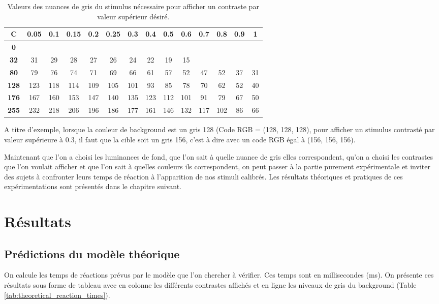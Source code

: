 	\begin{table}[h]	
		\centering
		\caption{Valeurs des nuances de gris du stimulus nécessaire pour afficher un contraste par valeur supérieur désiré.}
		\label{tab:contraste_inf}
		\begin{tabular}{c|ccccccccccccc}
			\textbf{C} & \textbf{0.05} & \textbf{0.1} & \textbf{0.15} & \textbf{0.2} & \textbf{0.25} & \textbf{0.3} & \textbf{0.4} & \textbf{0.5} & \textbf{0.6} & \textbf{0.7} & \textbf{0.8} & \textbf{0.9} & \textbf{1}\\
			\hline
			\textbf{0}\\
			\textbf{32} & 31 & 29 & 28 & 27 & 26 & 24 & 22 & 19 & 15\\
			\textbf{80} & 79 & 76 & 74 & 71 & 69 & 66 & 61 & 57 & 52 & 47 & 52 & 37 & 31\\
			\textbf{128} & 123 & 118 & 114 & 109 & 105 & 101 & 93 & 85 & 78 & 70 & 62 & 52 & 40\\
			\textbf{176} & 167 & 160 & 153 & 147 & 140 & 135 & 123 & 112 & 101 & 91 & 79 & 67 & 50\\
			\textbf{255} & 232 & 218 & 206 & 196 & 186 & 177 & 161 & 146 & 132 & 117 & 102 & 86 & 66\\
		\end{tabular}
	\end{table}
	
	\par A titre d'exemple, lorsque la couleur de background est un gris 128 (Code RGB = (128, 128, 128), pour afficher un stimulus contrasté par valeur supérieure à 0.3, il faut que la cible soit un gris 156, c'est à dire avec un code RGB égal à (156, 156, 156). 
	
	\par Maintenant que l'on a choisi les luminances de fond, que l'on sait à quelle nuance de gris elles correspondent, qu'on a choisi les contrastes que l'on voulait afficher et que l'on sait à quelles couleurs ils correspondent, on peut passer à la partie purement expérimentale et inviter des sujets à confronter leurs temps de réaction à l'apparition de nos stimuli calibrés. Les résultats théoriques et pratiques de ces expérimentations sont présentés dans le chapitre suivant.
	
\chapter{Résultats}
	\section{Prédictions du modèle théorique}
	\par On calcule les temps de réactions prévus par le modèle que l'on chercher à vérifier. Ces temps sont en millisecondes (ms). On présente ces résultats sous forme de tableau avec en colonne les différents contrastes affichés et en ligne les niveaux de gris du background (Table \ref{tab:theoretical_reaction_times}).
	
